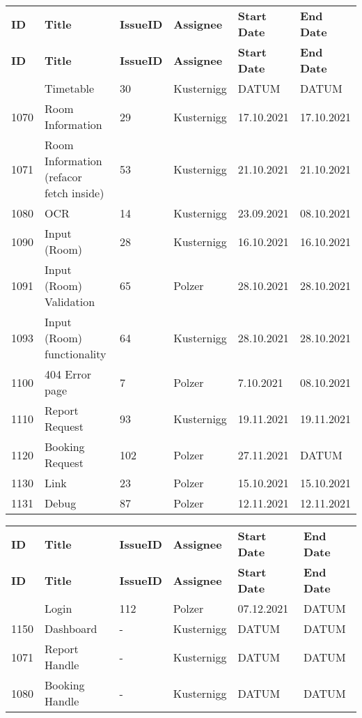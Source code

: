 \begin{longtable}{|p{}|p{}|p{}|p{}|p{}|p{}|} \hline
    \textbf{ID} & \textbf{Title} & \textbf{Issue\-ID} & \textbf{Assignee} & \textbf{Start Date} & \textbf{End\- Date} \\ \hhline{|=|=|=|=|=|=|}
    \endfirsthead
    \hline
    \textbf{ID} & \textbf{Title} & \textbf{Issue\-ID} & \textbf{Assignee} & \textbf{Start Date} & \textbf{End\- Date} \\ \hhline{|=|=|=|=|=|=|}
    \endhead
    1060 & Timetable & 30 & Kusternigg & DATUM & DATUM \\ \hline
    1070 & Room Information & 29 & Kusternigg & 17.10.2021 & 17.10.2021 \\ \hline
    1071 & Room Information (refacor fetch inside) & 53 & Kusternigg & 21.10.2021 & 21.10.2021 \\ \hline
    1080 & OCR  & 14 & Kusternigg &  23.09.2021 & 08.10.2021 \\ \hline
    1090 & Input (Room) & 28 & Kusternigg & 16.10.2021 & 16.10.2021 \\ \hline
    1091 & Input (Room) Validation & 65 & Polzer & 28.10.2021 & 28.10.2021 \\ \hline
    1093 & Input (Room) functionality & 64 & Kusternigg & 28.10.2021 & 28.10.2021 \\ \hline
    1100 & 404 Error page & 7 & Polzer & 7.10.2021 & 08.10.2021 \\ \hline
    1110 & Report Request & 93 & Kusternigg & 19.11.2021 & 19.11.2021 \\ \hline
    1120 & Booking Request & 102 & Polzer & 27.11.2021 & DATUM \\ \hline
    1130 & Link & 23 & Polzer & 15.10.2021 & 15.10.2021 \\ \hline
    1131 & Debug & 87 & Polzer & 12.11.2021 & 12.11.2021 \\ \hline
\end{longtable}


\begin{longtable}{|p{}|p{}|p{}|p{}|p{}|p{}|} \hline
    \textbf{ID} & \textbf{Title} & \textbf{Issue\-ID} & \textbf{Assignee} & \textbf{Start Date} & \textbf{End\- Date} \\ \hhline{|=|=|=|=|=|=|}
    \endfirsthead
    \hline
    \textbf{ID} & \textbf{Title} & \textbf{Issue\-ID} & \textbf{Assignee} & \textbf{Start Date} & \textbf{End\- Date} \\ \hhline{|=|=|=|=|=|=|}
    \endhead
    1140 & Login & 112 & Polzer & 07.12.2021 & DATUM \\ \hline
    1150 & Dashboard & - & Kusternigg & DATUM & DATUM \\ \hline
    1071 & Report Handle & - & Kusternigg & DATUM & DATUM \\ \hline
    1080 & Booking Handle & - & Kusternigg & DATUM & DATUM \\ \hline
\end{longtable}


